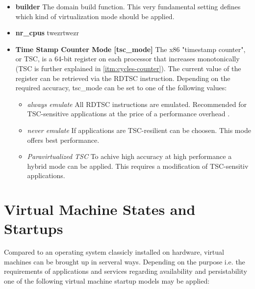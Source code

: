 \begin{itemize}
	\item \textbf{builder} The domain build function. This very fundamental setting defines which kind of virtualization mode should be applied.
	\item \textbf{nr\_cpus} twezrtwezr 
		
	\item \textbf{Time Stamp Counter Mode [\textsf{tsc\_mode}]} The x86 "timestamp counter", or TSC, is a 64-bit register on each processor that increases monotonically \cite{xentscmode} (TSC is further explained in \ref{itm:cycles-counter}). The current value of the register can be retrieved via the \textsf{RDTSC} instruction. Depending on the required accuracy, \textsf{tsc\_mode} can be set to one of the following values:
	\begin{itemize}
		\item \textit{always emulate} All \textsf{RDTSC} instructions are emulated. Recommended for TSC-sensitive applications at the price of a performance overhead \cite{xentscmode}.
		\item \textit{never emulate} If applications are TSC-resilient can be choosen. This mode offers best performance.
		\item \textit{Paravirtualized TSC} To achive high accuracy at high performance a hybrid mode can be applied. This requires a modification of TSC-sensitiv applications.
	\end{itemize}
\end{itemize}


\section{Virtual Machine States and Startups}
Compared to an operating system classicly installed on hardware, virtual machines can be brought up in serveral ways. Depending on the purpose i.e. the requirements of applications and services regarding availability and persistability one of the following virtual machine startup models may be applied:

